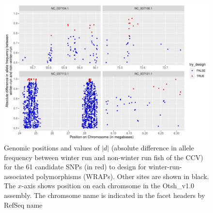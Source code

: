 \begin{figure}
\includegraphics[width=\textwidth]{images/wrap-candi.pdf}
\caption[
	61 candidates for primer design for winter-run-associated polymorphisms
]{
	\footnotesize Genomic positions and values of $|d|$ (absolute difference in
	allele frequency between winter run and non-winter run fish of the CCV)
	for the 61 candidate SNPs (in red) to design for winter-run-associated polymorphisms
	(WRAPs).  Other sites are shown in black.  The $x$-axis shows position on
	each chromsome in the Otsh\_v1.0 assembly.  The chromsome name is indicated in the facet headers by
	RefSeq name
}
\label{fig:wrap-slide-window}
\end{figure}

